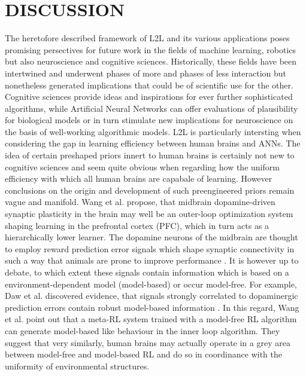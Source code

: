 \documentclass[letterpaper, 10 pt, conference]{ieeeconf}  %
\begin{document}
\section{DISCUSSION}
 
The heretofore described framework of L2L and its various applications poses promising persectives for future work in the fields 
of machine learning, robotics but also neuroscience and cognitive sciences. Historically, these fields have been intertwined and underwent
phases of more and phases of less interaction but nonetheless generated implications that could be of scientific use for the other. Cognitive 
sciences provide ideas and inspirations for ever further sophisticated algorithms, while Artificial Neural Networks can offer evaluations of 
plausibility for biological models or in turn stimulate new implications for neuroscience on the basis of well-working algorithmic models. L2L
is particularly intersting when considering the gap in learning efficiency between human brains and ANNs. The idea of certain preshaped 
priors innert to human brains is certainly not new to cognitive sciences and seem quite obvious when regarding how the uniform efficiency with 
which all human brains are capabale of learning. However conclusions on the origin and development of such preengineered priors remain vague
and manifold. Wang et al.\cite{wangPrefrontalCortexMetareinforcement2018} propose,
that midbrain dopamine-driven synaptic plasticity in the brain may well be an outer-loop optimization system shaping 
learning in the prefrontal cortex (PFC), 
which in turn acts as a hierarchically lower learner. The dopamine neurons of the midbrain are thought to employ reward prediction 
error signals which shape synaptic connectivity in such a way that animals are prone to improve performance 
\cite{montagueFrameworkMesencephalicDopamine1996}. It is however 
up to debate, to which extent these signals contain information which is based on a environment-dependent model (model-based) or occur model-free.
For example, \cite{dawModelbasedInfluencesHumans2011}Daw et al. discovered evidence, that signals strongly correlated to 
dopaminergic prediction errors contain robust model-based
information \cite{botvinickReinforcementLearningFast2019}\cite{dawModelbasedInfluencesHumans2011}.
In this regard, Wang et al.\cite{wangPrefrontalCortexMetareinforcement2018} point out that a meta-RL system trained with a model-free RL algorithm 
can generate model-based like behaviour in the inner loop algorithm. They suggest that very similarly, 
human brains may actually operate in a grey area between 
model-free and model-based RL and do so in coordinance with the uniformity of environmental structures. \newline
\end{document}
